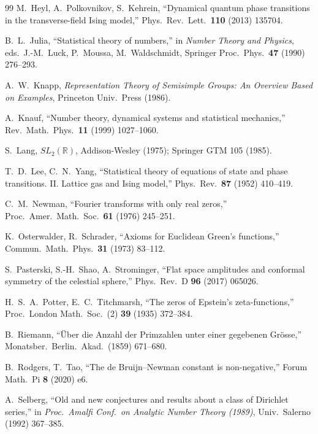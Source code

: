 \documentclass[11pt,a4paper]{article}
\theoremstyle{plain}
\theoremstyle{definition}
\theoremstyle{remark}
\newcommand{\R}{\mathbb{R}}
\begin{document}
\begin{thebibliography}{99}
 M.~Heyl, A.~Polkovnikov, S.~Kehrein, ``Dynamical quantum phase
transitions in the transverse-field Ising model,'' Phys.\ Rev.\ Lett.\ \textbf{110}
(2013) 135704.

 B.~L.~Julia, ``Statistical theory of numbers,'' in
\emph{Number Theory and Physics}, eds.\ J.-M.~Luck, P.~Moussa, M.~Waldschmidt,
Springer Proc.\ Phys.\ \textbf{47} (1990) 276--293.

 A.~W.~Knapp, \emph{Representation Theory of Semisimple Groups:
An Overview Based on Examples}, Princeton Univ.\ Press (1986).

 A.~Knauf, ``Number theory, dynamical systems and statistical
mechanics,'' Rev.\ Math.\ Phys.\ \textbf{11} (1999) 1027--1060.

 S.~Lang, \emph{$SL_2(\R)$}, Addison-Wesley (1975); Springer GTM 105 (1985).

 T.~D.~Lee, C.~N.~Yang, ``Statistical theory of equations of
state and phase transitions. II. Lattice gas and Ising model,'' Phys.\ Rev.\
\textbf{87} (1952) 410--419.

 C.~M.~Newman, ``Fourier transforms with only real zeros,''
Proc.\ Amer.\ Math.\ Soc.\ \textbf{61} (1976) 245--251.

 K.~Osterwalder, R.~Schrader, ``Axioms for
Euclidean Green's functions,'' Commun.\ Math.\ Phys.\ \textbf{31} (1973) 83--112.

 S.~Pasterski, S.-H.~Shao, A.~Strominger,
``Flat space amplitudes and conformal symmetry of the celestial sphere,''
Phys.\ Rev.\ D \textbf{96} (2017) 065026.

 H.~S.~A.~Potter, E.~C.~Titchmarsh, ``The zeros of
Epstein's zeta-functions,'' Proc.\ London Math.\ Soc.\ (2) \textbf{39} (1935) 372--384.

 B.~Riemann, ``\"Uber die Anzahl der Primzahlen unter einer
gegebenen Gr\"osse,'' Monatsber.\ Berlin.\ Akad.\ (1859) 671--680.

 B.~Rodgers, T.~Tao, ``The de Bruijn--Newman constant is
non-negative,'' Forum Math.\ Pi \textbf{8} (2020) e6.

 A.~Selberg, ``Old and new conjectures and results about a
class of Dirichlet series,'' in \emph{Proc.\ Amalfi Conf.\ on Analytic Number
Theory (1989)}, Univ.\ Salerno (1992) 367--385.


\end{thebibliography}
\end{document}
